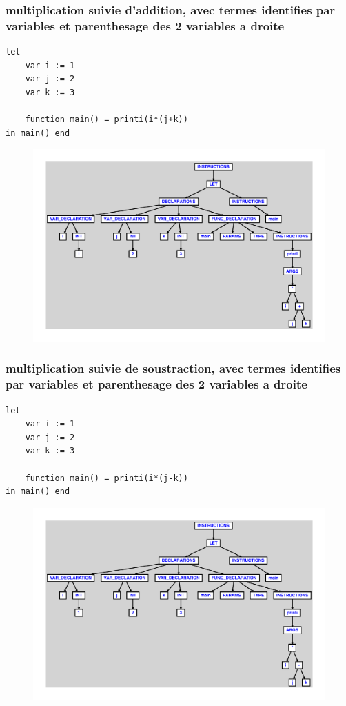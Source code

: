 \documentclass{article}
\begin{document}
\subsubsection{multiplication suivie d'addition, avec termes identifies par variables et parenthesage des 2 variables a droite}
\begin{lstlisting}
let
	var i := 1
	var j := 2
	var k := 3

	function main() = printi(i*(j+k))
in main() end
\end{lstlisting}
\newpage
\begin{figure}[H]
\centering
\includegraphics[max width=\textwidth]{ast/ast_115.pdf}
\end{figure}
\newpage
\subsubsection{multiplication suivie de soustraction, avec termes identifies par variables et parenthesage des 2 variables a droite}
\begin{lstlisting}
let
	var i := 1
	var j := 2
	var k := 3

	function main() = printi(i*(j-k))
in main() end
\end{lstlisting}
\newpage
\begin{figure}[H]
\centering
\includegraphics[max width=\textwidth]{ast/ast_116.pdf}
\end{figure}
\newpage
\end{document}
